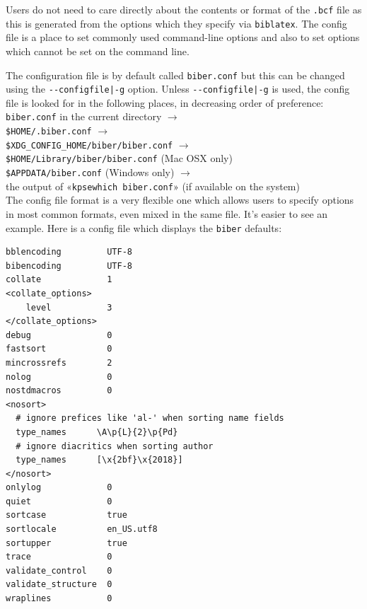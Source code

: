 \documentclass{ltxdockit}
\begin{document}
\noindent Users do not need to care directly about the contents or format of the
\verb+.bcf+ file as this is generated from the options which they specify
via \verb+biblatex+. The config file is a place to set commonly used
command-line options and also to set options which cannot be set on the
command line.

The configuration file is by default called \verb+biber.conf+ but this can
be changed using the \verb+--configfile|-g+ option. Unless
\verb+--configfile|-g+ is used, the config file is
looked for in the following places, in decreasing order of preference:\\[2ex]

\noindent \verb+biber.conf+ in the current directory $\rightarrow$\\
\hspace*{1em}\verb+$HOME/.biber.conf+ $\rightarrow$\\
\hspace*{2em}\verb+$XDG_CONFIG_HOME/biber/biber.conf+ $\rightarrow$\\
\hspace*{3em}\verb+$HOME/Library/biber/biber.conf+ (Mac OSX only)\\
\hspace*{3em}\verb+$APPDATA/biber.conf+ (Windows only) $\rightarrow$\\
\hspace*{4em}the output of «\verb+kpsewhich biber.conf+» (if available on the
system)\\[2ex]

\noindent The config file format is a very flexible one which allows users to specify
options in most common formats, even mixed in the same file. It's easier to
see an example. Here is a config file which displays the \verb+biber+
defaults:

\begin{verbatim}
bblencoding         UTF-8
bibencoding         UTF-8
collate             1
<collate_options>
    level           3
</collate_options>
debug               0
fastsort            0
mincrossrefs        2
nolog               0
nostdmacros         0
<nosort>
  # ignore prefices like 'al-' when sorting name fields
  type_names      \A\p{L}{2}\p{Pd}
  # ignore diacritics when sorting author
  type_names      [\x{2bf}\x{2018}]
</nosort>
onlylog             0
quiet               0
sortcase            true
sortlocale          en_US.utf8
sortupper           true
trace               0
validate_control    0
validate_structure  0
wraplines           0
\end{verbatim}
\end{document}

